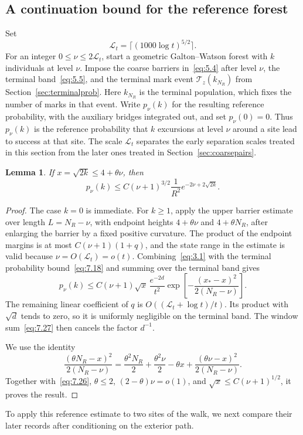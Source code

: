 \documentclass[11pt,letterpaper,reqno]{amsart}
\newif\ifrevmarks \revmarkstrue
\newif\ifshowdeleted \showdeletedfalse
\newcommand{\add}[1]{\ifrevmarks\textcolor{revorange}{#1}\else#1\fi}
\newcommand{\del}[1]{\ifrevmarks\ifshowdeleted{\color{revorange}\footnotesize[\textit{deleted:}~#1]}%
  \else\mbox{\textsuperscript{\textcolor{revorange}{\normalfont\bfseries[del]}}}\fi\fi}
\numberwithin{equation}{section}
\newtheorem{lemma}[theorem]{Lemma}
\theoremstyle{remark}
\begin{document}
\subsection{\texorpdfstring{\del{Proof of Lemma~\ref{lem:continuation}}\add{A continuation bound for the reference forest}}{A continuation bound for the reference forest}}\label{sec:continuation}
Set
\begin{equation}\label{eq:7.29}
\mathcal L_t=\lceil(1000\log t)^{5/2}\rceil.
\end{equation}
For an integer $0\le\nu\le2\mathcal L_t$, start a geometric Galton--Watson forest with $k$ individuals at level $\nu$. Impose the coarse barriers in~\eqref{eq:5.4} after level $\nu$, the terminal band~\eqref{eq:5.5}, and the terminal mark event $\mathcal T_z(k_{N_R})$ from Section~\ref{sec:terminalprob}. Here $k_{N_R}$ is the terminal population, which fixes the number of marks in that event. Write $p_\nu(k)$ for the resulting reference probability, with the auxiliary bridges integrated out, and set $p_\nu(0)=0$. \add{Thus $p_\nu(k)$ is the reference probability that $k$ excursions at level $\nu$ around a site lead to success at that site. The scale $\mathcal L_t$ separates the early separation scales treated in this section from the later ones treated in Section~\ref{sec:coarsepairs}.}

\begin{lemma}\label{lem:continuation}
If $x=\sqrt{2k}\le4+\theta\nu$, then
\begin{equation}\label{eq:7.30}
p_{\nu}(k)\le C(\nu+1)^{3/2}\frac{1}{R^2}
 e^{-2\nu+2\sqrt{2k}}.
\end{equation}
\end{lemma}
\begin{proof}
The case $k=0$ is immediate. For $k\ge1$, apply the upper barrier estimate over length $L=N_R-\nu$, with endpoint heights $4+\theta\nu$ and $4+\theta N_R$, after enlarging the barrier by a fixed positive curvature. The product of the endpoint margins is at most $C(\nu+1)(1+q)$, and the state range in the estimate is valid because $\nu=O(\mathcal L_t)=o(t)$. Combining~\eqref{eq:3.1} with the terminal probability bound~\eqref{eq:7.18} and summing over the terminal band gives
\begin{equation}\label{eq:7.31}
p_{\nu}(k)\le C(\nu+1)\sqrt{x}\,\frac{e^{-2d}}{t^2}
\exp\left[-\frac{(x_*-x)^2}{2(N_R-\nu)}\right].
\end{equation}
The remaining linear coefficient of $q$ is $O((\mathcal L_t+\log t)/t)$. Its product with $\sqrt d$ tends to zero, so it is uniformly negligible on the terminal band. The window sum~\eqref{eq:7.27} then cancels the factor $d^{-1}$.

We use the identity
\begin{equation}\label{eq:7.32}
\frac{(\theta N_R-x)^2}{2(N_R-\nu)}
=\frac{\theta^2N_R}{2}+\frac{\theta^2\nu}{2}-\theta x
+\frac{(\theta \nu-x)^2}{2(N_R-\nu)}.
\end{equation}
Together with~\eqref{eq:7.26}, $\theta\le2$, $(2-\theta)\nu=o(1)$, and $\sqrt x\le C(\nu+1)^{1/2}$, it proves the result.
\end{proof}
To apply this reference estimate to two sites of the walk, we next compare their later records after conditioning on the exterior path.
\end{document}
